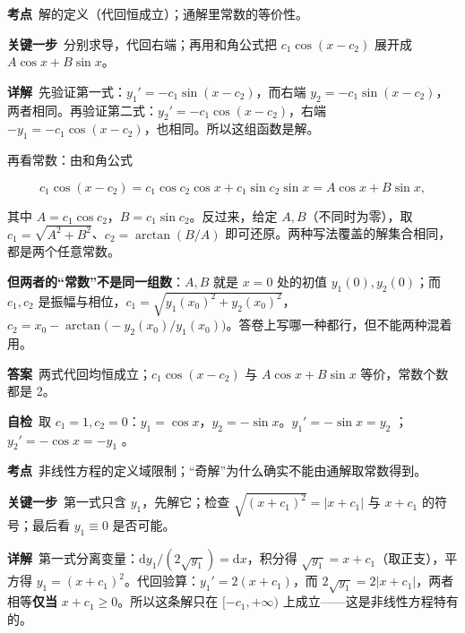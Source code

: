 \documentclass[11pt]{ctexart}
\renewcommand{\qbreak}{\needspace{0.26\textheight}}
\newcommand{\qpagebreak}{\needspace{0.92\textheight}}
\begin{document}
\qpagebreak
{}
\label{app:a1}

\qbreak
{}

\textbf{考点}\ 解的定义（代回恒成立）；通解里常数的等价性。

\textbf{关键一步}\ 分别求导，代回右端；再用和角公式把 $c_1\cos(x-c_2)$ 展开成 $A\cos x+B\sin x$。

\textbf{详解}\ 先验证第一式：$y_1'=-c_1\sin(x-c_2)$，而右端 $y_2=-c_1\sin(x-c_2)$，两者相同。再验证第二式：$y_2'=-c_1\cos(x-c_2)$，右端 $-y_1=-c_1\cos(x-c_2)$，也相同。所以这组函数是解。

再看常数：由和角公式

\[
c_1\cos(x-c_2)=c_1\cos c_2\cos x+c_1\sin c_2\sin x=A\cos x+B\sin x,
\]

其中 $A=c_1\cos c_2$，$B=c_1\sin c_2$。反过来，给定 $A,B$（不同时为零），取 $c_1=\sqrt{A^2+B^2}$、$c_2=\arctan(B/A)$ 即可还原。两种写法覆盖的解集合相同，都是两个任意常数。

\textbf{但两者的“常数”不是同一组数}：$A,B$ 就是 $x=0$ 处的初值 $y_1(0),y_2(0)$；而 $c_1,c_2$ 是振幅与相位，$c_1=\sqrt{y_1(x_0)^2+y_2(x_0)^2}$，$c_2=x_0-\arctan\bigl(-y_2(x_0)/y_1(x_0)\bigr)$。答卷上写哪一种都行，但不能两种混着用。

\textbf{答案}\ 两式代回均恒成立；$c_1\cos(x-c_2)$ 与 $A\cos x+B\sin x$ 等价，常数个数都是 2。

\textbf{自检}\ 取 $c_1=1,c_2=0$：$y_1=\cos x$，$y_2=-\sin x$。$y_1'=-\sin x=y_2$ ；$y_2'=-\cos x=-y_1$ 。

\qpagebreak
{}
\label{app:a2}

\qbreak
{}

\textbf{考点}\ 非线性方程的定义域限制；“奇解”为什么确实不能由通解取常数得到。

\textbf{关键一步}\ 第一式只含 $y_1$，先解它；检查 $\sqrt{(x+c_1)^2}=|x+c_1|$ 与 $x+c_1$ 的符号；最后看 $y_1\equiv0$ 是否可能。

\textbf{详解}\ 第一式分离变量：$\mathrm{d}y_1/(2\sqrt{y_1})=\mathrm{d}x$，积分得 $\sqrt{y_1}=x+c_1$（取正支），平方得 $y_1=(x+c_1)^2$。代回验算：$y_1'=2(x+c_1)$，而 $2\sqrt{y_1}=2|x+c_1|$，两者相等\textbf{仅当} $x+c_1\ge0$。所以这条解只在 $[-c_1,+\infty)$ 上成立——这是非线性方程特有的。
\end{document}
